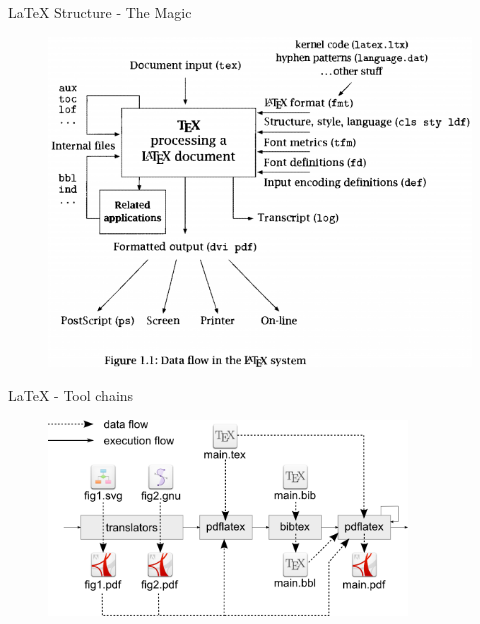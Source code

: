 \documentclass[10pt,times]{beamer}
\begin{document}
\begin{frame}{LaTeX Structure - The Magic}
\begin{figure}
\centering
\includegraphics[height=0.95\textheight]{figs/LaTeX.png}
\end{figure}
\end{frame}

\begin{frame}{LaTeX - Tool chains}
\begin{figure}
\centering
\includegraphics[width=0.85\textwidth]{figs/Latex-file-flow.png}
\end{figure}
\end{frame}
\end{document}

